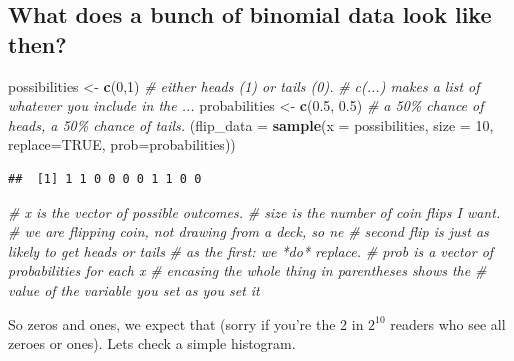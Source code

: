 \documentclass[
]{book}
\newenvironment{Shaded}{\begin{snugshade}}{\end{snugshade}}
\newcommand{\CommentTok}[1]{\textcolor[rgb]{0.56,0.35,0.01}{\textit{#1}}}
\newcommand{\DataTypeTok}[1]{\textcolor[rgb]{0.13,0.29,0.53}{#1}}
\newcommand{\DecValTok}[1]{\textcolor[rgb]{0.00,0.00,0.81}{#1}}
\newcommand{\FloatTok}[1]{\textcolor[rgb]{0.00,0.00,0.81}{#1}}
\newcommand{\KeywordTok}[1]{\textcolor[rgb]{0.13,0.29,0.53}{\textbf{#1}}}
\newcommand{\NormalTok}[1]{#1}
\newcommand{\OtherTok}[1]{\textcolor[rgb]{0.56,0.35,0.01}{#1}}
\newcommand{\StringTok}[1]{\textcolor[rgb]{0.31,0.60,0.02}{#1}}
\begin{document}
\hypertarget{what-does-a-bunch-of-binomial-data-look-like-then}{%
\subsection{What does a bunch of binomial data look like then?}\label{what-does-a-bunch-of-binomial-data-look-like-then}}

\begin{Shaded}
\begin{Highlighting}[]
\NormalTok{possibilities \textless{}{-}}\StringTok{ }\KeywordTok{c}\NormalTok{(}\DecValTok{0}\NormalTok{,}\DecValTok{1}\NormalTok{) }\CommentTok{\# either heads (1) or tails (0).}
                        \CommentTok{\# c(...) makes a list of whatever you include in the ...}
\NormalTok{probabilities \textless{}{-}}\StringTok{ }\KeywordTok{c}\NormalTok{(}\FloatTok{0.5}\NormalTok{, }\FloatTok{0.5}\NormalTok{)}
                        \CommentTok{\# a 50\% chance of heads, a 50\% chance of tails.}
\NormalTok{(}\DataTypeTok{flip\_data =} \KeywordTok{sample}\NormalTok{(}\DataTypeTok{x =}\NormalTok{ possibilities, }\DataTypeTok{size =} \DecValTok{10}\NormalTok{, }\DataTypeTok{replace=}\OtherTok{TRUE}\NormalTok{, }\DataTypeTok{prob=}\NormalTok{probabilities))}
\end{Highlighting}
\end{Shaded}

\begin{verbatim}
##  [1] 1 1 0 0 0 0 1 1 0 0
\end{verbatim}

\begin{Shaded}
\begin{Highlighting}[]
                        \CommentTok{\# x is the vector of possible outcomes.}
                        \CommentTok{\# size is the number of coin flips I want.}
                        \CommentTok{\# we are flipping coin, not drawing from a deck, so ne}
                        \CommentTok{\#   second flip is just as likely to get heads or tails}
                        \CommentTok{\#   as the first: we *do* replace.}
                        \CommentTok{\# prob is a vector of probabilities for each x}
                        \CommentTok{\# encasing the whole thing in parentheses shows the}
                        \CommentTok{\#   value of the variable you set as you set it}
\end{Highlighting}
\end{Shaded}

So zeros and ones, we expect that (sorry if you're the 2 in \(2^{10}\) readers who see all zeroes or ones). Lets check a simple histogram.
\end{document}
